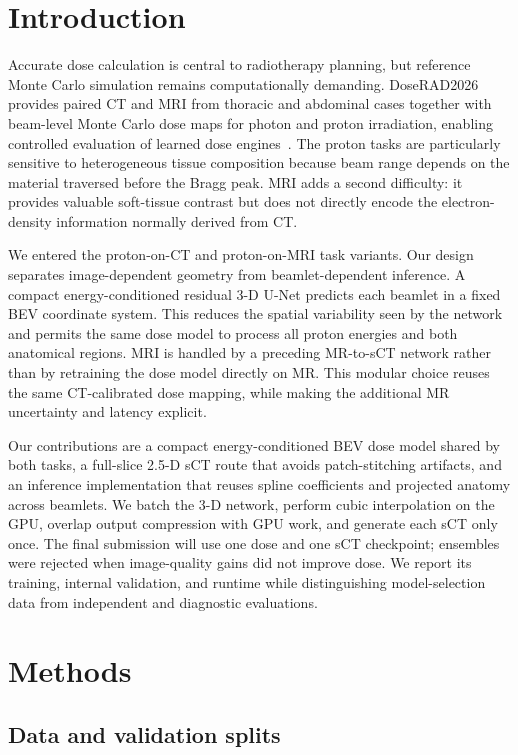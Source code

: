 \documentclass[runningheads]{llncs}
\begin{document}
\section{Introduction}

Accurate dose calculation is central to radiotherapy planning, but reference
Monte Carlo simulation remains computationally demanding. DoseRAD2026 provides
paired CT and MRI from thoracic and abdominal cases together with beam-level
Monte Carlo dose maps for photon and proton irradiation, enabling controlled
evaluation of learned dose engines~\cite{xiao2026doserad}. The proton tasks are
particularly sensitive to heterogeneous tissue composition because beam range
depends on the material traversed before the Bragg peak. MRI adds a second
difficulty: it provides valuable soft-tissue contrast but does not directly
encode the electron-density information normally derived from CT.

We entered the proton-on-CT and proton-on-MRI task variants. Our design
separates image-dependent geometry from beamlet-dependent inference. A compact
energy-conditioned residual 3-D U-Net predicts each beamlet in a fixed BEV
coordinate system. This reduces the spatial variability seen by the network
and permits the same dose model to process all proton energies and both
anatomical regions. MRI is handled by a preceding MR-to-sCT network rather than
by retraining the dose model directly on MR. This modular choice reuses the
same CT-calibrated dose mapping, while making the additional MR uncertainty and
latency explicit.

Our contributions are a compact energy-conditioned BEV dose model shared by
both tasks, a full-slice 2.5-D sCT route that avoids patch-stitching artifacts,
and an inference implementation that reuses spline coefficients and projected
anatomy across beamlets. We batch the 3-D network, perform cubic interpolation
on the GPU, overlap output compression with GPU work, and generate each sCT
only once. The final submission will use one dose and one sCT checkpoint;
ensembles were rejected when image-quality gains did not improve dose. We
report its training, internal validation, and runtime while distinguishing
model-selection data from independent and diagnostic evaluations.

\section{Methods}

\subsection{Data and validation splits}
\end{document}
